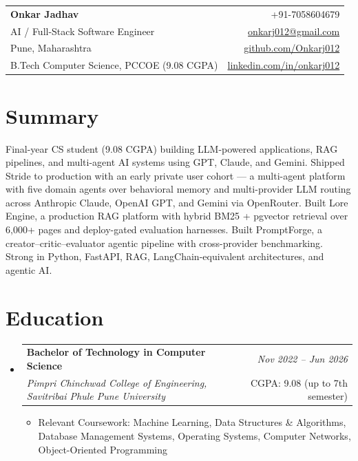 \documentclass[a4paper,11pt]{article}
\makeatletter
\newcommand{\resumeSubheading}[4]{
\vspace{0.5mm}\item
    \begin{tabular*}{0.98\textwidth}[t]{l@{\extracolsep{\fill}}r}
        \textbf{#1} & \textit{\footnotesize{#4}} \\
        \textit{\footnotesize{#3}} & \footnotesize{#2}\\
    \end{tabular*}
    \vspace{-2.4mm}
}
\newcommand{\resumeSubHeadingListStart}{\begin{itemize}[leftmargin=*,labelsep=0mm]}
\newcommand{\resumeItemListStart}{\begin{justify}\begin{itemize}[leftmargin=3ex, rightmargin=2ex, noitemsep,labelsep=1.2mm,itemsep=0mm]\small}
\newcommand{\resumeSubHeadingListEnd}{\end{itemize}\vspace{2mm}}
\newcommand{\resumeItemListEnd}{\end{itemize}\end{justify}\vspace{-2mm}}
\newcommand{\name}{Onkar Jadhav}
\newcommand{\phone}{7058604679}
\newcommand{\emaila}{onkarj012@gmail.com}
\newcommand{\github}{github.com/Onkarj012}
\newcommand{\linkedin}{linkedin.com/in/onkarj012}
\makeatother
\begin{document}
\begin{tabularx}{\linewidth}{L r}
  \textbf{\Large \name} & {+91-\phone} \\
  {AI / Full-Stack Software Engineer} & \href{mailto:\emaila}{\emaila} \\
  {Pune, Maharashtra} & \href{https://\github}{\github} \\
  {B.Tech Computer Science, PCCOE (9.08 CGPA)} & \href{https://\linkedin}{\linkedin}
\end{tabularx}
\vspace{-4mm}

\section{\textbf{Summary}}
\vspace{1mm}
\small{
Final-year CS student (9.08 CGPA) building LLM-powered applications, RAG pipelines, and multi-agent AI systems using GPT, Claude, and Gemini. Shipped Stride to production with an early private user cohort --- a multi-agent platform with five domain agents over behavioral memory and multi-provider LLM routing across Anthropic Claude, OpenAI GPT, and Gemini via OpenRouter. Built Lore Engine, a production RAG platform with hybrid BM25 + pgvector retrieval over 6,000+ pages and deploy-gated evaluation harnesses. Built PromptForge, a creator--critic--evaluator agentic pipeline with cross-provider benchmarking. Strong in Python, FastAPI, RAG, LangChain-equivalent architectures, and agentic AI.
}
\vspace{-3mm}

\section{\textbf{Education}}
  \resumeSubHeadingListStart
    \resumeSubheading
      {Bachelor of Technology in Computer Science}{CGPA: 9.08 (up to 7th semester)}
      {Pimpri Chinchwad College of Engineering, Savitribai Phule Pune University}{Nov 2022 -- Jun 2026}
      \resumeItemListStart
        \item {Relevant Coursework: Machine Learning, Data Structures \& Algorithms, Database Management Systems, Operating Systems, Computer Networks, Object-Oriented Programming}
      \resumeItemListEnd
  \resumeSubHeadingListEnd
\vspace{-5.5mm}

\end{document}
